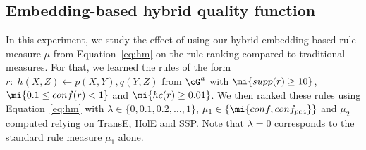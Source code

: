 



\subsection{Embedding-based hybrid quality function}





In this experiment, we study the effect of using our hybrid embedding-based %
rule measure $\mu$ from Equation~\ref{eq:hm} on the %
rule ranking compared to traditional measures. For that, we %
learned  the %
rules of the form $r:\;h(X,Z) \leftarrow p(X,Y), q(Y,Z)$ from $\cG^a$ with $\mi{supp(r)\geq 10}$, $\mi{0.1\leq conf(r)<1}$ and $\mi{hc(r)\geq 0.01}$. %
We then ranked these rules using Equation~\ref{eq:hm} with $\lambda\in \{0, 0.1, 0.2, \dotsc, 1\}$, $\mu_1\in \{\mi{conf,conf_{pca}}\}$ and $\mu_2$ computed relying on TransE, HolE and SSP.
Note that $\lambda=0$ corresponds to the standard rule measure $\mu_1$ alone.

